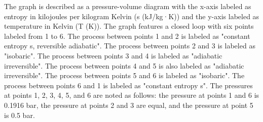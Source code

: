 The graph is described as a pressure-volume diagram with the x-axis labeled as entropy in kilojoules per kilogram Kelvin (s (kJ/kg·K)) and the y-axis labeled as temperature in Kelvin (T (K)). The graph features a closed loop with six points labeled from 1 to 6. The process between points 1 and 2 is labeled as "constant entropy s, reversible adiabatic". The process between points 2 and 3 is labeled as "isobaric". The process between points 3 and 4 is labeled as "adiabatic irreversible". The process between points 4 and 5 is also labeled as "adiabatic irreversible". The process between points 5 and 6 is labeled as "isobaric". The process between points 6 and 1 is labeled as "constant entropy s". The pressures at points 1, 2, 3, 4, 5, and 6 are noted as follows: the pressure at points 1 and 6 is 0.1916 bar, the pressure at points 2 and 3 are equal, and the pressure at point 5 is 0.5 bar.